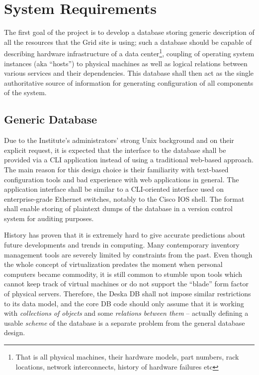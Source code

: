 \documentclass{article}
\begin{document}
\section{System Requirements}

The first goal of the project is to develop a database storing generic description of all the resources that the Grid
site is using; such a database should be capable of describing hardware infrastructure of a data center\footnote{That is all
physical machines, their hardware models, part numbers, rack locations, network interconnects, history of hardware failures etc},
coupling of operating system instances (aka ``hosts'') to physical machines as well as logical relations between various
services and their dependencies.  This database shall then act as the single authoritative source of information for generating
configuration of all components of the system.

\subsection{Generic Database}

Due to the Institute's administrators' strong Unix background and on their explicit request, it is expected that the interface to
the database shall be provided via a CLI application instead of using a traditional web-based approach.  The main reason for this
design choice is their familiarity with text-based configuration tools and bad experience with web applications in general.  The
application interface shall be similar to a CLI-oriented interface used on enterprise-grade Ethernet switches, notably to the
Cisco IOS shell.  The format shall enable storing of plaintext dumps of the database in a version control system for auditing
purposes.

History has proven that it is extremely hard to give accurate predictions about future developments and trends in computing.  Many
contemporary inventory management tools are severely limited by constraints from the past.  Even though the whole concept of
virtualization predates the moment when personal computers became commodity, it is still common to stumble upon tools which cannot
keep track of virtual machines or do not support the ``blade'' form factor of physical servers.  Therefore, the Deska DB shall not
impose similar restrictions to its data model, and the core DB code should only assume that it is working with {\em collections of
objects} and some {\em relations between them} -- actually defining a usable {\em scheme} of the database is a separate problem
from the general database design.
\end{document}
